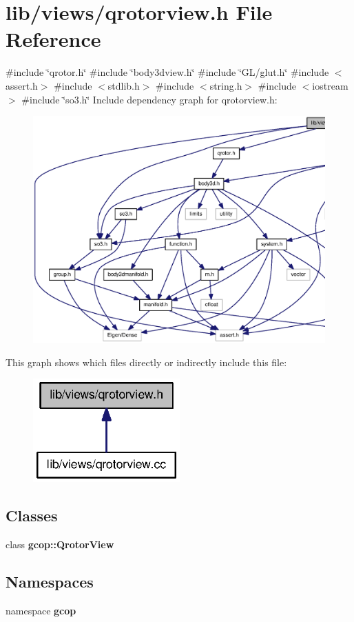 \section{lib/views/qrotorview.h \-File \-Reference}
\label{qrotorview_8h}
{\ttfamily \#include \char`\"{}qrotor.\-h\char`\"{}}\*
{\ttfamily \#include \char`\"{}body3dview.\-h\char`\"{}}\*
{\ttfamily \#include \char`\"{}\-G\-L/glut.\-h\char`\"{}}\*
{\ttfamily \#include $<$assert.\-h$>$}\*
{\ttfamily \#include $<$stdlib.\-h$>$}\*
{\ttfamily \#include $<$string.\-h$>$}\*
{\ttfamily \#include $<$iostream$>$}\*
{\ttfamily \#include \char`\"{}so3.\-h\char`\"{}}\*
\-Include dependency graph for qrotorview.\-h\-:
\nopagebreak
\begin{figure}[H]
\begin{center}
\leavevmode
\includegraphics[width=350pt]{qrotorview_8h__incl}
\end{center}
\end{figure}
\-This graph shows which files directly or indirectly include this file\-:
\nopagebreak
\begin{figure}[H]
\begin{center}
\leavevmode
\includegraphics[width=160pt]{qrotorview_8h__dep__incl}
\end{center}
\end{figure}
\subsection*{\-Classes}
\begin{DoxyCompactItemize}
\item 
class {\bf gcop\-::\-Qrotor\-View}
\end{DoxyCompactItemize}
\subsection*{\-Namespaces}
\begin{DoxyCompactItemize}
\item 
namespace {\bf gcop}
\end{DoxyCompactItemize}
